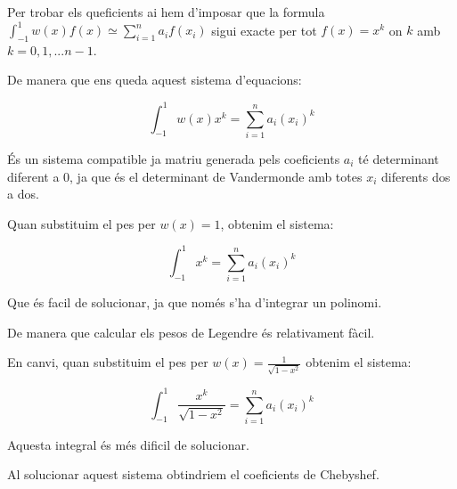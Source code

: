 \documentclass{article}
\begin{document}
	Per trobar els queficients ai hem d'imposar que la formula $\int_{-1}^{1} w(x)f(x)\simeq \sum_{i=1}^{n}a_if(x_i)$ sigui exacte per tot $f(x)=x^k$ on $k$ amb $k=0,1,...n-1$.
	
	De manera que ens queda aquest sistema d'equacions:
	
	$$\int_{-1}^{1}w(x)x^k=\sum_{i=1}^{n}a_i(x_i)^k$$
	
	És un sistema compatible ja matriu generada pels coeficients $a_i$ té determinant diferent a 0, ja que és el determinant de Vandermonde amb totes $x_i$ diferents dos a dos.
	
	Quan substituim el pes per $w(x)=1$, obtenim el sistema:
	
	$$\int_{-1}^{1}x^k=\sum_{i=1}^{n}a_i(x_i)^k$$
	
	Que és facil de solucionar, ja que només s'ha d'integrar un polinomi.
	
	De manera que calcular els pesos de Legendre és relativament fàcil.
	
	En canvi, quan substituim el pes per $w(x)=\frac{1}{\sqrt{1-x^2}}$ obtenim el sistema:
	
	$$\int_{-1}^{1}\frac{x^k}{\sqrt{1-x^2}}=\sum_{i=1}^{n}a_i(x_i)^k$$
	
	Aquesta integral és més dificil de solucionar.
	
	Al solucionar aquest sistema obtindriem el coeficients de Chebyshef.
	
\end{document}
